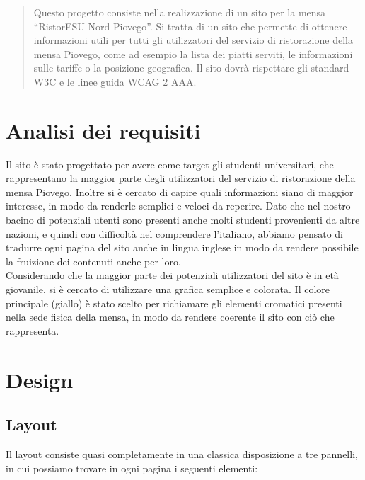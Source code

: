 \documentclass[10pt,a4paper,onecolumn]{article}
\begin{document}
\clearpage

\tableofcontents

\clearpage 

\begin{abstract}
Questo progetto consiste nella realizzazione di un sito per la mensa ``RistorESU Nord Piovego''.
Si tratta di un sito che permette di ottenere informazioni utili per tutti gli utilizzatori del servizio di ristorazione della mensa Piovego, come ad esempio la lista dei piatti serviti, le informazioni sulle tariffe o la posizione geografica.
Il sito dovrà rispettare gli standard W3C e le linee guida WCAG 2 AAA.
\end{abstract}

\clearpage

\section{Analisi dei requisiti}
Il sito è stato progettato per avere come target gli studenti universitari, che rappresentano la maggior parte degli utilizzatori del servizio di ristorazione della mensa Piovego. Inoltre si è cercato di capire quali informazioni siano di maggior interesse, in modo da renderle semplici e veloci da reperire.
Dato che nel nostro bacino di potenziali utenti sono presenti anche molti studenti provenienti da altre nazioni, e quindi con difficoltà nel comprendere l'italiano, abbiamo pensato di tradurre ogni pagina del sito anche in lingua inglese in modo da rendere possibile la fruizione dei contenuti anche per loro. \\
Considerando che la maggior parte dei potenziali utilizzatori del sito è in età giovanile, si è cercato di utilizzare una grafica semplice e colorata. Il colore principale (giallo) è stato scelto per richiamare gli elementi cromatici presenti nella sede fisica della mensa, in modo da rendere coerente il sito con ciò che rappresenta.

\section{Design}

\subsection{Layout}

Il layout consiste quasi completamente in una classica disposizione a tre pannelli, in cui possiamo trovare in ogni pagina i seguenti elementi:
\end{document}
